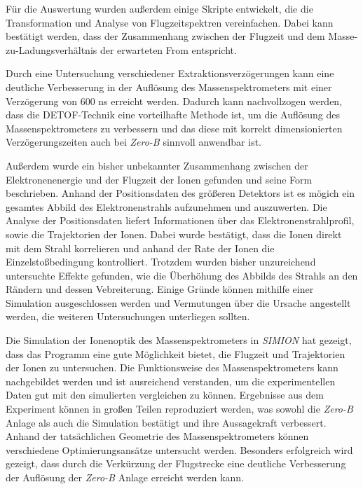 Für die Auswertung wurden außerdem einige Skripte entwickelt, die die Transformation und Analyse von Flugzeitspektren vereinfachen. Dabei kann bestätigt werden, dass der Zusammenhang zwischen der Flugzeit und dem Masse-zu-Ladungsverhältnis der erwarteten From entspricht.

Durch eine Untersuchung verschiedener Extraktionsverzögerungen kann eine deutliche Verbesserung in der Auflösung des Massenspektrometers mit einer Verzögerung von 600 ns erreicht werden. Dadurch kann nachvollzogen werden, dass die DETOF-Technik eine vorteilhafte Methode ist, um die Auflösung des Massenspektrometers zu verbessern und das diese mit korrekt dimensionierten Verzögerungszeiten auch bei \textit{Zero-B} sinnvoll anwendbar ist.

Außerdem wurde ein bisher unbekannter Zusammenhang zwischen der Elektronenenergie und der Flugzeit der Ionen gefunden und seine Form beschrieben. Anhand der Positionsdaten des größeren Detektors ist es mögich ein gesamtes Abbild des Elektronenstrahls aufzunehmen und auszuwerten. Die Analyse der Positionsdaten liefert Informationen über das Elektronenstrahlprofil, sowie die Trajektorien der Ionen. Dabei wurde bestätigt, dass die Ionen direkt mit dem Strahl korrelieren und anhand der Rate der Ionen die Einzelstoßbedingung kontrolliert. Trotzdem wurden bisher unzureichend untersuchte Effekte gefunden, wie die Überhöhung des Abbilds des Strahls an den Rändern und dessen Vebreiterung. Einige Gründe können mithilfe einer Simulation ausgeschlossen werden und Vermutungen über die Ursache angestellt werden, die weiteren Untersuchungen unterliegen sollten.

Die Simulation der Ionenoptik des Massenspektrometers in \textit{SIMION} hat gezeigt, dass das Programm eine gute Möglichkeit bietet, die Flugzeit und Trajektorien der Ionen zu untersuchen. Die Funktionsweise des Massenspektrometers kann nachgebildet werden und ist ausreichend verstanden, um die experimentellen Daten gut mit den simulierten vergleichen zu können. Ergebnisse aus dem Experiment können in großen Teilen reproduziert werden, was sowohl die \textit{Zero-B} Anlage als auch die Simulation bestätigt und ihre Aussagekraft verbessert. Anhand der tatsächlichen Geometrie des Massenspektrometers können verschiedene Optimierungsansätze untersucht werden. Besonders erfolgreich wird gezeigt, dass durch die Verkürzung der Flugstrecke eine deutliche Verbesserung der Auflösung der \textit{Zero-B} Anlage erreicht werden kann. 

